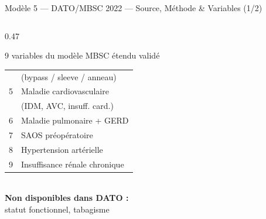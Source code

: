 \documentclass[aspectratio=169]{beamer}
\begin{document}
\begin{frame}{Modèle 5 --- DATO/MBSC 2022 --- Source, Méthode \& Variables (1/2)}
\begin{columns}[T]
\begin{column}{0.47\textwidth}
\begin{block}{9 variables du modèle MBSC étendu validé}
\begin{tabular}{cl}
          & (bypass / sleeve / anneau) \\
          5 & Maladie cardiovasculaire \\
          & (IDM, AVC, insuff. card.) \\
          6 & Maladie pulmonaire + GERD \\
          7 & SAOS préopératoire \\
          8 & Hypertension artérielle \\
          9 & Insuffisance rénale chronique \\
          \bottomrule
        \end{tabular}
        \vspace{6pt}\\
        \textcolor{rougealerte}{\footnotesize\textbf{Non disponibles dans DATO :}\\
        statut fonctionnel, tabagisme}
      \end{block}
    \end{column}
  \end{columns}
\end{frame}
\end{document}
